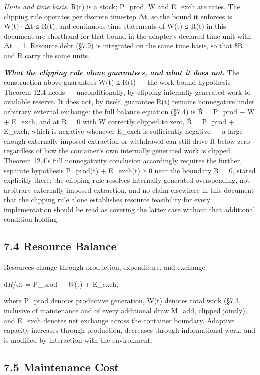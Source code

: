 \documentclass[
]{article}
\begin{document}
\emph{Units and time basis.} R(t) is a stock; P\_prod, W and E\_exch are
rates. The clipping rule operates per discrete timestep Δt, so the bound
it enforces is W(t)·Δt ≤ R(t), and continuous-time statements of W(t) ≤
R(t) in this document are shorthand for that bound in the adapter's
declared time unit with Δt = 1. Resource debt (§7.9) is integrated on
the same time basis, so that δR and R carry the same units.

\emph{\textbf{What the clipping rule alone guarantees, and what it does
not.}} The construction above guarantees W(t) ≤ R(t) --- the work-bound
hypothesis Theorem 12.4 needs --- unconditionally, by clipping
internally generated work to available reserve. It does not, by itself,
guarantee R(t) remains nonnegative under arbitrary external exchange:
the full balance equation (§7.4) is Ṙ = P\_prod − W + E\_exch, and at R
= 0 with W correctly clipped to zero, Ṙ = P\_prod + E\_exch, which is
negative whenever E\_exch is sufficiently negative --- a large enough
externally imposed extraction or withdrawal can still drive R below zero
regardless of how the container's own internally generated work is
clipped. Theorem 12.4's full nonnegativity conclusion accordingly
requires the further, separate hypothesis P\_prod(t) + E\_exch(t) ≥ 0
near the boundary R = 0, stated explicitly there; the clipping rule
resolves internally generated overspending, not arbitrary externally
imposed extraction, and no claim elsewhere in this document that the
clipping rule alone establishes resource feasibility for every
implementation should be read as covering the latter case without that
additional condition holding.

\hypertarget{resource-balance}{%
\subsection{7.4 Resource Balance}\label{resource-balance}}

Resources change through production, expenditure, and exchange:

d\emph{R}/dt = P\_prod − \emph{W}(t) + E\_exch,

where P\_prod denotes productive generation, W(t) denotes total work
(§7.3, inclusive of maintenance and of every additional draw M\_add,
clipped jointly), and E\_exch denotes net exchange across the container
boundary. Adaptive capacity increases through production, decreases
through informational work, and is modified by interaction with the
environment.

\hypertarget{maintenance-cost}{%
\subsection{7.5 Maintenance Cost}\label{maintenance-cost}}
\end{document}
